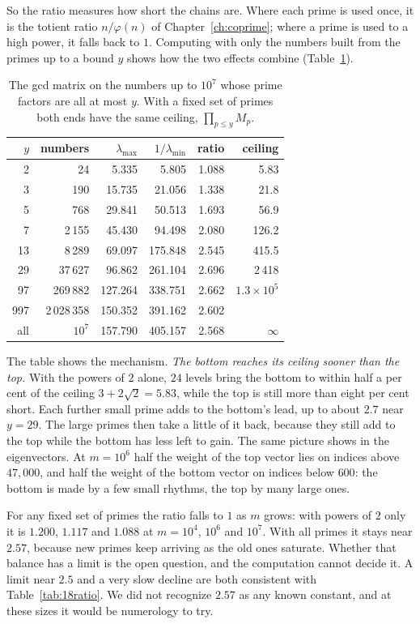 So the ratio measures how short the chains are. Where each prime is used once, it is the totient ratio
$n/\varphi(n)$ of Chapter~\ref{ch:coprime}; where a prime is used to a high power, it falls back to $1$. Computing with
only the numbers built from the primes up to a bound $y$ shows how the two effects combine
(Table~\ref{tab:18smooth}).

\begin{table}[ht]
\centering
\caption{The gcd matrix on the numbers up to $10^{7}$ whose prime factors are all at most $y$. With a
fixed set of primes both ends have the same ceiling, $\prod_{p\le y}M_p$.}\label{tab:18smooth}
\small
\begin{tabular}{rrrrrr}
\hline
$y$ & numbers & $\lambda_{\max}$ & $1/\lambda_{\min}$ & ratio & ceiling\\
\hline
2 & 24 & 5.335 & 5.805 & 1.088 & 5.83\\
3 & 190 & 15.735 & 21.056 & 1.338 & 21.8\\
5 & 768 & 29.841 & 50.513 & 1.693 & 56.9\\
7 & 2\,155 & 45.430 & 94.498 & 2.080 & 126.2\\
13 & 8\,289 & 69.097 & 175.848 & 2.545 & 415.5\\
29 & 37\,627 & 96.862 & 261.104 & 2.696 & 2\,418\\
97 & 269\,882 & 127.264 & 338.751 & 2.662 & $1.3\times10^{5}$\\
997 & 2\,028\,358 & 150.352 & 391.162 & 2.602 & \\
all & $10^{7}$ & 157.790 & 405.157 & 2.568 & $\infty$\\
\hline
\end{tabular}
\end{table}

The table shows the mechanism. \emph{The bottom reaches its ceiling sooner than the top.} With the powers
of $2$ alone, $24$ levels bring the bottom to within half a per cent of the ceiling $3+2\sqrt2=5.83$,
while the top is still more than eight per cent short. Each further small prime adds to the bottom's lead, up to
about $2.7$ near $y=29$. The large primes then take a little of it back, because they still add to the
top while the bottom has less left to gain. The same picture shows in the eigenvectors. At $m=10^{6}$
half the weight of the top vector lies on indices above $47{,}000$, and half the weight of the bottom
vector on indices below $600$: the bottom is made by a few small rhythms, the top by many large ones.

For any fixed set of primes the ratio falls to $1$ as $m$ grows: with powers of $2$ only it is $1.200$,
$1.117$ and $1.088$ at $m=10^{4}$, $10^{6}$ and $10^{7}$. With all primes it stays near $2.57$, because new
primes keep arriving as the old ones saturate. Whether that balance has a limit is the open question, and
the computation cannot decide it. A limit near $2.5$ and a very slow decline are both consistent with
Table~\ref{tab:18ratio}. We did not recognize $2.57$ as any known constant, and at these sizes it would be
numerology to try.

